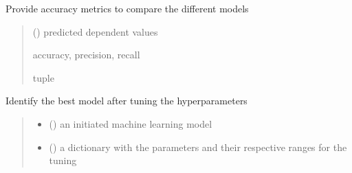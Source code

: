 \documentclass[letterpaper,10pt,english]{sphinxmanual}
\begin{document}
\begin{fulllineitems}
\begin{fulllineitems}
\label{\detokenize{BeeClassification:BeeClassification.BeeClassification.accuracy_metrics}}
\pysigstartsignatures
{}
\pysigstopsignatures
\sphinxAtStartPar
Provide accuracy metrics to compare the different models
\begin{quote}\begin{description}
\sphinxAtStartPar
{} () \textendash{} predicted dependent values

\sphinxAtStartPar
accuracy, precision, recall

\sphinxAtStartPar
tuple

\end{description}\end{quote}

\end{fulllineitems}


\begin{fulllineitems}
\label{\detokenize{BeeClassification:BeeClassification.BeeClassification.best_model}}
\pysigstartsignatures
{}
\pysigstopsignatures
\sphinxAtStartPar
Identify the best model after tuning the hyperparameters
\begin{quote}\begin{description}
\begin{itemize}
\item {} 
\sphinxAtStartPar
{} () \textendash{} an initiated machine learning model

\item {} 
\sphinxAtStartPar
{} () \textendash{} a dictionary with the parameters and their respective ranges for the tuning

\end{itemize}


\end{description}
\end{quote}
\end{fulllineitems}
\end{fulllineitems}
\end{document}

